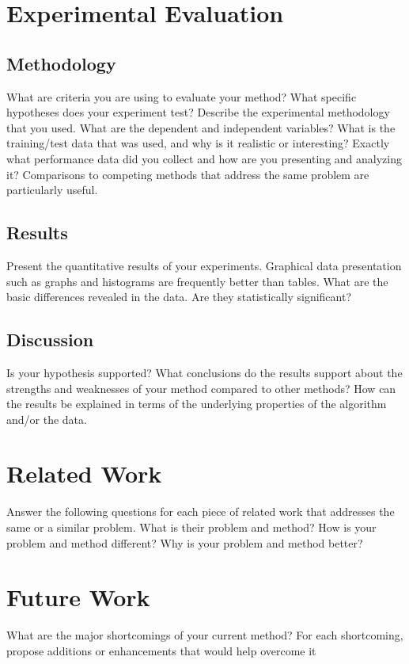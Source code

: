 \documentclass[11pt]{article}
\begin{document}
\section{Experimental Evaluation}
\subsection{Methodology}
What are criteria you are using to evaluate your method? What specific hypotheses does
your experiment test? Describe the experimental methodology that you used. What are the
dependent and independent variables? What is the training/test data that was used, and why
is it realistic or interesting? Exactly what performance data did you collect and how are
you presenting and analyzing it? Comparisons to competing methods that address the same
problem are particularly useful.

\subsection{Results}
Present the quantitative results of your experiments. Graphical data presentation such as
graphs and histograms are frequently better than tables. What are the basic differences
revealed in the data. Are they statistically significant?

\subsection{Discussion}
Is your hypothesis supported? What conclusions do the results support about the strengths
and weaknesses of your method compared to other methods? How can the results be explained
in terms of the underlying properties of the algorithm and/or the data.

\section{Related Work}
Answer the following questions for each piece of related work that addresses the same or
a similar problem. What is their problem and method? How is your problem and method
different? Why is your problem and method better?

\section{Future Work}
What are the major shortcomings of your current method? For each shortcoming, propose
additions or enhancements that would help overcome it
\end{document}
